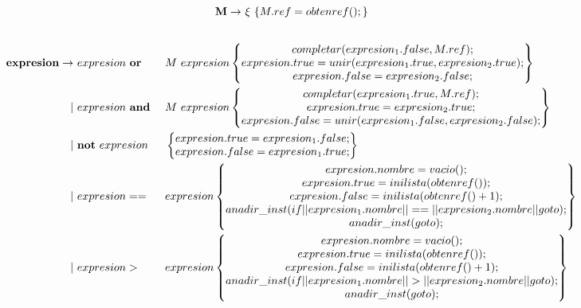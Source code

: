 \documentclass[12pt,a4paper,landscape]{article}
\theoremstyle{mytheor}
\begin{document}
  \begin{alignat*}{2}
     \text{\textbf{M}} \to\ &\xi\ \{M.ref=obtenref();\}\\\\
  \end{alignat*}
\begin{alignat*}{2}
\text{\textbf{expresion}} \to\ &  expresion\ \textbf{or} && M\ expresion \begin{Bmatrix} completar(expresion_1.false, M.ref);\\ expresion.true=unir(expresion_1.true, expresion_2.true); \\  expresion.false=expresion_2.false;\end{Bmatrix} \\
      |\ & expresion\ \textbf{and}\ && M\ expresion  \begin{Bmatrix} completar(expresion_1.true, M.ref);\\ expresion.true=expresion_2.true; \\  expresion.false=unir(expresion_1.false, expresion_2.false);\end{Bmatrix}\\
      |\ & \textbf{not}\ expresion && \begin{Bmatrix} expresion.true=expresion_1.false; \\  expresion.false=expresion_1.true;\end{Bmatrix}\\
      |\ & expresion == && expresion \begin{Bmatrix} expresion.nombre = vacio();\\ expresion.true=inilista(obtenref()); \\  expresion.false=inilista(obtenref()+1);\\ anadir\_inst(if||expresion_1.nombre||==||expresion_2.nombre||goto);\\ anadir\_inst(goto);\end{Bmatrix} \\
    |\ & expresion > && expresion                \begin{Bmatrix} expresion.nombre = vacio();\\ expresion.true=inilista(obtenref()); \\  expresion.false=inilista(obtenref()+1);\\ anadir\_inst(if||expresion_1.nombre||>||expresion_2.nombre||goto);\\ anadir\_inst(goto);\end{Bmatrix} \\
\end{alignat*}
\end{document}
